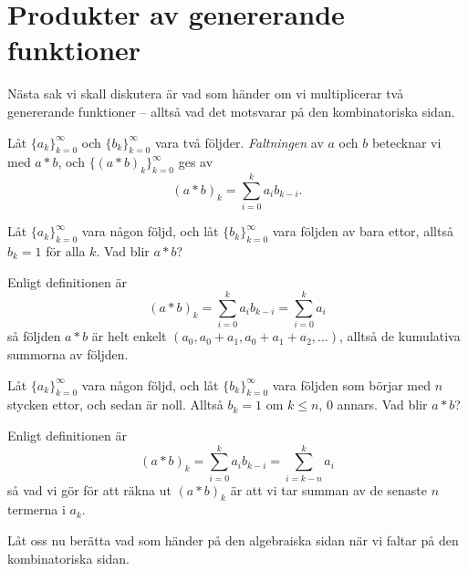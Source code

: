 \documentclass[nobib]{tufte-handout}
\begin{document}
\section{Produkter av genererande funktioner}

Nästa sak vi skall diskutera är vad som händer om vi multiplicerar två genererande funktioner -- alltså vad det motsvarar på den kombinatoriska sidan.

\begin{definition}
    Låt $\{a_k\}_{k=0}^\infty$ och $\{b_k\}_{k=0}^\infty$ vara två följder. \emph{Faltningen} av $a$ och $b$ betecknar vi med $a*b$, och $\{(a * b)_k\}_{k=0}^\infty$ ges av
    $$(a*b)_k = \sum_{i=0}^{k} a_i b_{k-i}.$$
\end{definition}

\begin{example}
    Låt $\{a_k\}_{k=0}^\infty$ vara någon följd, och låt $\{b_k\}_{k=0}^\infty$ vara följden av bara ettor, alltså $b_k = 1$ för alla $k$. Vad blir $a*b$?

    Enligt definitionen är
    $$(a*b)_k = \sum_{i=0}^{k} a_i b_{k-i} = \sum_{i=0}^{k} a_i$$
    så följden $a*b$ är helt enkelt $(a_0, a_0 + a_1, a_0 + a_1 + a_2, \ldots)$, alltså de kumulativa summorna av följden.
\end{example}

\begin{example}
    Låt $\{a_k\}_{k=0}^\infty$ vara någon följd, och låt $\{b_k\}_{k=0}^\infty$ vara följden som börjar med $n$ stycken ettor, och sedan är noll. Alltså $b_k = 1$ om $k \leq n$, $0$ annars. Vad blir $a*b$?

    Enligt definitionen är
    $$(a*b)_k = \sum_{i=0}^{k} a_i b_{k-i} = \sum_{i=k-n}^{k} a_i$$
    så vad vi gör för att räkna ut $(a*b)_k$ är att vi tar summan av de senaste $n$ termerna i $a_k$.
\end{example}

Låt oss nu berätta vad som händer på den algebraiska sidan när vi faltar på den kombinatoriska sidan.
\end{document}
